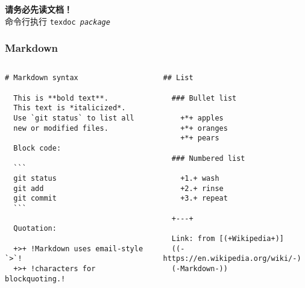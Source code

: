 \begin{frame}[standout]
  \huge \textbf{请务必先读文档！} \\[1ex] \pause
  \footnotesize 命令行执行 \texttt{texdoc \textit{package}}
\end{frame}

\begin{frame}[fragile]
\frametitle{Markdown}
\begin{columns}
\begin{column}{0.5\textwidth}
  \begin{lstlisting}[gobble=2]
  # Markdown syntax

  This is **bold text**.
  This text is *italicized*.
  Use `git status` to list all
  new or modified files.

  Block code:

  ```
  git status
  git add
  git commit
  ```

  Quotation:

  +>+ !Markdown uses email-style `>`!
  +>+ !characters for blockquoting.!
  \end{lstlisting}
\end{column}
\begin{column}{0.5\textwidth}
  \begin{lstlisting}[gobble=2]
  ## List

  ### Bullet list

    +*+ apples
    +*+ oranges
    +*+ pears

  ### Numbered list

    +1.+ wash
    +2.+ rinse
    +3.+ repeat

  +---+

  Link: from [(+Wikipedia+)]
  ((-https://en.wikipedia.org/wiki/-)
  (-Markdown-))

  \end{lstlisting}
\end{column}
\end{columns}
\vspace{-0.6cm}
\end{frame}

